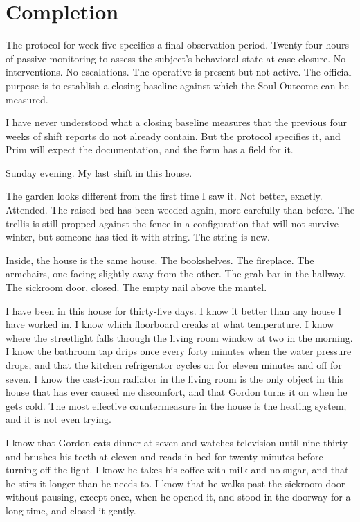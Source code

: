 
\chapter{Completion}

The protocol for week five specifies a final observation period. Twenty-four hours of passive monitoring to assess the subject's behavioral state at case closure. No interventions. No escalations. The operative is present but not active. The official purpose is to establish a closing baseline against which the Soul Outcome can be measured.

I have never understood what a closing baseline measures that the previous four weeks of shift reports do not already contain. But the protocol specifies it, and Prim will expect the documentation, and the form has a field for it.

Sunday evening. My last shift in this house.

The garden looks different from the first time I saw it. Not better, exactly. Attended. The raised bed has been weeded again, more carefully than before. The trellis is still propped against the fence in a configuration that will not survive winter, but someone has tied it with string. The string is new.

Inside, the house is the same house. The bookshelves. The fireplace. The armchairs, one facing slightly away from the other. The grab bar in the hallway. The sickroom door, closed. The empty nail above the mantel.

I have been in this house for thirty-five days. I know it better than any house I have worked in. I know which floorboard creaks at what temperature. I know where the streetlight falls through the living room window at two in the morning. I know the bathroom tap drips once every forty minutes when the water pressure drops, and that the kitchen refrigerator cycles on for eleven minutes and off for seven. I know the cast-iron radiator in the living room is the only object in this house that has ever caused me discomfort, and that Gordon turns it on when he gets cold. The most effective countermeasure in the house is the heating system, and it is not even trying.

I know that Gordon eats dinner at seven and watches television until nine-thirty and brushes his teeth at eleven and reads in bed for twenty minutes before turning off the light. I know he takes his coffee with milk and no sugar, and that he stirs it longer than he needs to. I know that he walks past the sickroom door without pausing, except once, when he opened it, and stood in the doorway for a long time, and closed it gently.

